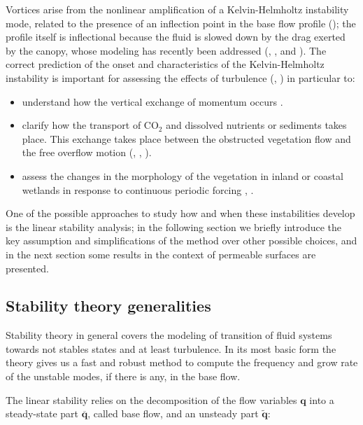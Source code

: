 Vortices arise from the nonlinear amplification of a Kelvin-Helmholtz instability mode, related to the presence of an inflection point in the base flow profile (\citet{asaeda2005morphological}); the profile itself is inflectional because the fluid is slowed down by the drag exerted by the canopy, whose modeling has recently been addressed (\citet{py2004mixing}, \citet{singh2016linear},  \citet{zampogna2016instability} and \citet{tilton2008linear}).
The correct prediction of the onset and characteristics of the Kelvin-Helmholtz instability is important for assessing the effects of turbulence (\citet{finnigan2000turbulence}, \citet{jimenez2001turbulent}) in particular to:

\begin{itemize}
	\item understand how the vertical exchange of momentum occurs \citet{ikeda1996three}.
	\item clarify how the transport of $\text{CO}_2$ and dissolved nutrients or sediments takes place. This exchange takes place between the
	obstructed vegetation flow and the free overflow motion (\citet{gambi1990flume}, \citet{eckman1987role}, \citet{grizzle1996hydrodynamically}).
	\item assess the changes in the morphology of the vegetation in inland or coastal wetlands in
	response to continuous periodic forcing \citet{asaeda2005morphological}, \citet{patil2010characteristics}.
\end{itemize}

One of the possible approaches to study how and when these instabilities develop is the linear stability analysis; in the following section we briefly introduce the key assumption and simplifications of the method over other possible choices, and in the next section some results in the context of permeable surfaces are presented.


\subsection{Stability theory generalities}

Stability theory in general covers the modeling of transition of fluid systems towards not stables states and at least turbulence.
In its most basic form the theory gives us a fast and robust method to compute the frequency and grow rate of the unstable modes, if there is any, in the base flow.

The linear stability relies on the decomposition of the flow variables $\mathbf{q}$ into a steady-state part $\overline{\mathbf{q}}$, called base flow, and an unsteady part $\widetilde{\mathbf{q}}$:

